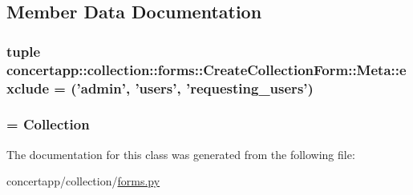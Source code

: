 \subsection{Member Data Documentation}
\hypertarget{classconcertapp_1_1collection_1_1forms_1_1_create_collection_form_1_1_meta_ae1a934f14843620ff8cb9adf693e6df5}{
\subsubsection[{exclude}]{\setlength{\rightskip}{0pt plus 5cm}tuple {\bf concertapp::collection::forms::CreateCollectionForm::Meta::exclude} = ('admin', 'users', 'requesting\_\-users')}}
\label{classconcertapp_1_1collection_1_1forms_1_1_create_collection_form_1_1_meta_ae1a934f14843620ff8cb9adf693e6df5}
\hypertarget{classconcertapp_1_1collection_1_1forms_1_1_create_collection_form_1_1_meta_ab8e868cd1d80769e06795373e40c48b3}{
\subsubsection[{model}]{ = Collection}}
\label{classconcertapp_1_1collection_1_1forms_1_1_create_collection_form_1_1_meta_ab8e868cd1d80769e06795373e40c48b3}


The documentation for this class was generated from the following file:\begin{DoxyCompactItemize}
\item 
concertapp/collection/\hyperlink{collection_2forms_8py}{forms.py}\end{DoxyCompactItemize}
